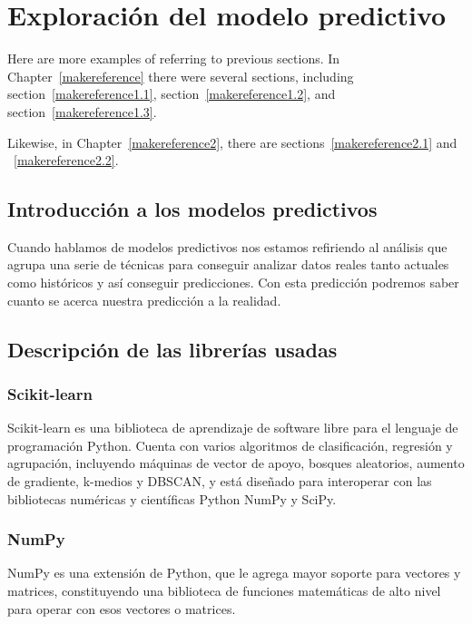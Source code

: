 \cleardoublepage

\chapter{Exploración del modelo predictivo}
\label{makereference3}

Here are more examples of referring to previous sections.  In
Chapter~\ref{makereference} there were several sections, including
section~\ref{makereference1.1}, section~\ref{makereference1.2},
and section~\ref{makereference1.3}.

Likewise, in Chapter~\ref{makereference2}, there are
sections~\ref{makereference2.1} and ~\ref{makereference2.2}.

\section{Introducción a los modelos predictivos}
\label{makereference3.1}

Cuando hablamos de modelos predictivos nos estamos refiriendo al análisis que agrupa una serie de técnicas para conseguir analizar datos reales tanto actuales como históricos y así conseguir predicciones. Con esta predicción podremos saber cuanto se acerca nuestra predicción a la realidad.

\section{Descripción de las librerías usadas}
\label{makereference3.2}
	\subsection{Scikit-learn}
	Scikit-learn es una biblioteca de aprendizaje de software libre para el lenguaje de programación Python. Cuenta con varios algoritmos de clasificación, regresión y agrupación, incluyendo máquinas de vector de apoyo, bosques aleatorios, aumento de gradiente, k-medios y DBSCAN, y está diseñado para interoperar con las bibliotecas numéricas y científicas Python NumPy y SciPy.
	
	\subsection{NumPy}
	NumPy es una extensión de Python, que le agrega mayor soporte para vectores y matrices, constituyendo una biblioteca de funciones matemáticas de alto nivel para operar con esos vectores o matrices.
	
